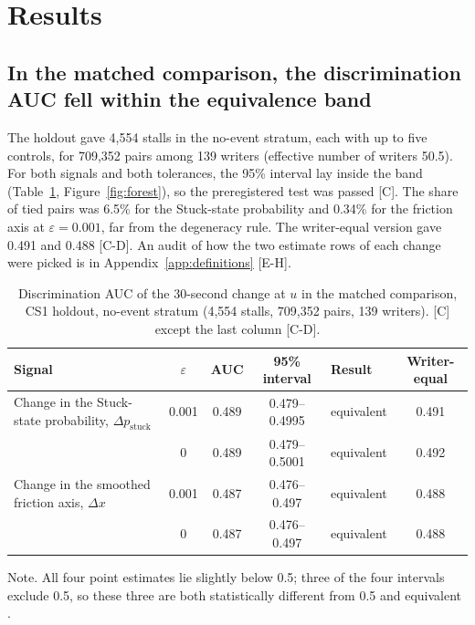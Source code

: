 \section{Results}
\label{sec:results}

\subsection{In the matched comparison, the discrimination AUC fell within the equivalence band}
\label{sec:res-main}

The holdout gave 4,554 stalls in the no-event stratum, each with up to five controls, for 709,352 pairs among 139
writers (effective number of writers 50.5). For both signals and both tolerances, the 95\% interval lay inside the band
(Table~\ref{tab:main}, Figure~\ref{fig:forest}), so the preregistered test was passed [C]. The share of tied pairs was
6.5\% for the Stuck-state probability and 0.34\% for the friction axis at $\varepsilon = 0.001$, far from the
degeneracy rule. The writer-equal version gave 0.491 and 0.488 [C-D]. An audit of how the two estimate rows of each change were picked is in
Appendix~\ref{app:definitions} [E-H].

\begin{table}
  \caption{Discrimination AUC of the 30-second change at $u$ in the matched comparison, CS1 holdout, no-event stratum
  (4,554 stalls, 709,352 pairs, 139 writers). [C] except the last column [C-D].}
  \label{tab:main}
  \centering\small
  \begin{tabularx}{\linewidth}{>{\raggedright\arraybackslash}X c c c l c}
    \toprule
    Signal & $\varepsilon$ & AUC & 95\% interval & Result & Writer-equal \\
    \midrule
    Change in the Stuck-state probability, $\Delta p_{\mathrm{stuck}}$ & 0.001 & 0.489 & 0.479--0.4995 & equivalent & 0.491 \\
     & 0 & 0.489 & 0.479--0.5001 & equivalent & 0.492 \\
    Change in the smoothed friction axis, $\Delta x$ & 0.001 & 0.487 & 0.476--0.497 & equivalent & 0.488 \\
     & 0 & 0.487 & 0.476--0.497 & equivalent & 0.488 \\
    \bottomrule
  \end{tabularx}

  \smallskip
  \parbox{\linewidth}{\footnotesize Note. All four point estimates lie slightly below 0.5; three of the four intervals
  exclude 0.5, so these three are both statistically different from 0.5 and equivalent \cite{lakens2018equivalence}.}
\end{table}

